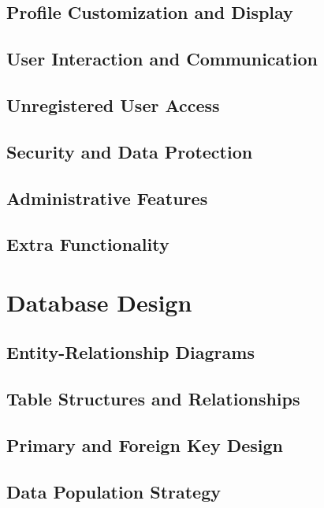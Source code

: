 \documentclass[12pt]{article}
\begin{document}
\subsection{Profile Customization and Display}
\subsection{User Interaction and Communication}
\subsection{Unregistered User Access}
\subsection{Security and Data Protection}
\subsection{Administrative Features}
\subsection{Extra Functionality}

\newpage
\section{Database Design}
\subsection{Entity-Relationship Diagrams}
\subsection{Table Structures and Relationships}
\subsection{Primary and Foreign Key Design}
\subsection{Data Population Strategy}
\end{document}
